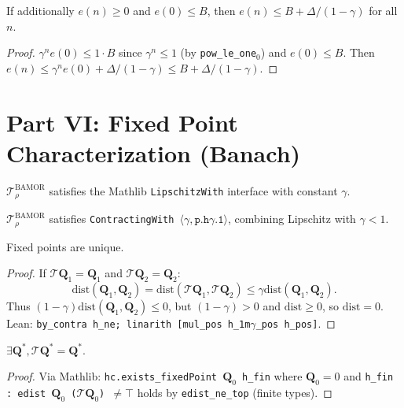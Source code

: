 \begin{theorem}
If additionally $e(n) \ge 0$ and $e(0) \le B$, then $e(n) \le B + \Delta/(1{-}\gamma)$ for all $n$.
\end{theorem}
\begin{proof}
$\gamma^n e(0) \le 1 \cdot B$ since $\gamma^n \le 1$ (by \texttt{pow\_le\_one$_0$}) and $e(0) \le B$.  Then $e(n) \le \gamma^n e(0) + \Delta/(1{-}\gamma) \le B + \Delta/(1{-}\gamma)$.
\end{proof}


\section{Part VI: Fixed Point Characterization (Banach)}
\label{app:banach}

\begin{lemma}
$\mathcal{T}^{\mathrm{BAMOR}}_\rho$ satisfies the Mathlib \texttt{LipschitzWith} interface with constant $\gamma$.
\end{lemma}

\begin{lemma}
$\mathcal{T}^{\mathrm{BAMOR}}_\rho$ satisfies \texttt{ContractingWith $\langle\gamma, \texttt{p.h}\gamma\texttt{.1}\rangle$}, combining Lipschitz with $\gamma < 1$.
\end{lemma}

\begin{theorem}
Fixed points are unique.
\end{theorem}
\begin{proof}
If $\mathcal{T}\mathbf{Q}_1 = \mathbf{Q}_1$ and $\mathcal{T}\mathbf{Q}_2 = \mathbf{Q}_2$:
\begin{equation}
    \mathrm{dist}(\mathbf{Q}_1, \mathbf{Q}_2) = \mathrm{dist}(\mathcal{T}\mathbf{Q}_1, \mathcal{T}\mathbf{Q}_2) \le \gamma \mathrm{dist}(\mathbf{Q}_1, \mathbf{Q}_2).
\end{equation}
Thus $(1{-}\gamma) \mathrm{dist}(\mathbf{Q}_1, \mathbf{Q}_2) \le 0$, but $(1{-}\gamma) > 0$ and $\mathrm{dist} \ge 0$, so $\mathrm{dist} = 0$.  Lean: \texttt{by\_contra h\_ne; linarith [mul\_pos h\_1m$\gamma$\_pos h\_pos]}.
\end{proof}

\begin{theorem}
$\exists \mathbf{Q}^*, \mathcal{T}\mathbf{Q}^* = \mathbf{Q}^*$.
\end{theorem}
\begin{proof}
Via Mathlib: \texttt{hc.exists\_fixedPoint $\mathbf{Q}_0$ h\_fin} where $\mathbf{Q}_0 = 0$ and \texttt{h\_fin : edist $\mathbf{Q}_0$ ($\mathcal{T}\mathbf{Q}_0$) $\ne \top$} holds by \texttt{edist\_ne\_top} (finite types).
\end{proof}


